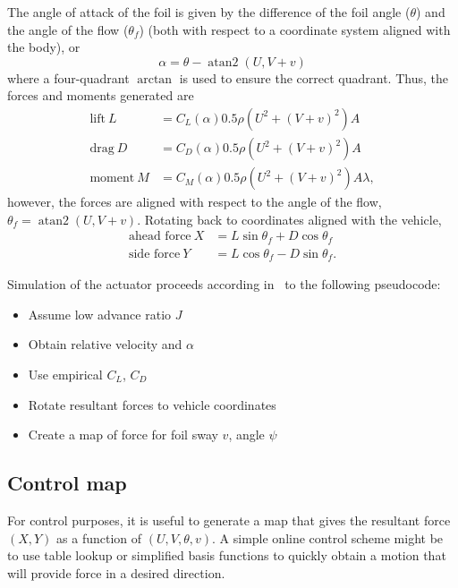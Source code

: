 \documentclass[twocolumn,10pt]{IEEEtran}
\begin{document}
The angle of attack of the foil is given by the difference of the foil angle ($\theta$) and the angle of the flow ($\theta_f$) (both with respect to a coordinate system aligned with the body), or
\begin{equation}
\alpha = \theta - \operatorname{atan2}(U,V+v)
\end{equation}
where a four-quadrant $\arctan$ is used to ensure the correct quadrant. Thus, the forces and moments generated are
\begin{align}
\mbox{lift}\ L &= C_L(\alpha) 0.5\rho(U^2+(V+v)^2) A \\
\mbox{drag}\ D &= C_D(\alpha) 0.5\rho(U^2+(V+v)^2) A \\
\mbox{moment}\ M &= C_M(\alpha) 0.5\rho(U^2+(V+v)^2) A\lambda, 
\end{align}
however, the forces are aligned with respect to the angle of the flow, $\theta_f=\operatorname{atan2}(U,V+v)$. Rotating back to coordinates aligned with the vehicle, 
\begin{align}
\mbox{ahead force}\ X &= L\sin\theta_f + D\cos\theta_f \\
\mbox{side force}\ Y &= L\cos\theta_f - D\sin\theta_f.
\end{align}

Simulation of the actuator proceeds according in \Matlab\ to the following pseudocode:
\begin{itemize}
\item Assume low advance ratio $J$
\item Obtain relative velocity and $\alpha$
\item Use empirical $C_L$, $C_D$
\item Rotate resultant forces to vehicle coordinates
\item Create a map of force for foil sway $v$, angle $\psi$
\end{itemize}

\subsection{Control map}
For control purposes, it is useful to generate a map that gives the resultant force $(X,Y)$ as a function of $(U,V,\theta,v)$. A simple online control scheme might be to use table lookup or simplified basis functions to quickly obtain a motion that will provide force in a desired direction. 
\end{document}
